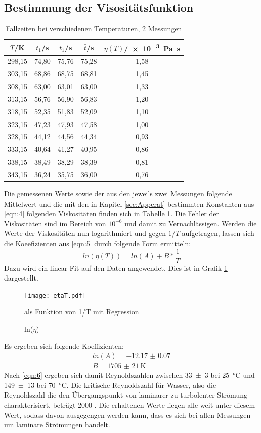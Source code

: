 \subsection{Bestimmung der Visositätsfunktion}
\begin{table}[h]
  \centering
  \caption{Fallzeiten bei verschiedenen Temperaturen, 2 Messungen}
  \label{tab:4}
  \begin{tabular}{c c c c c}
    \toprule
    $T$/\si{\kelvin} & $t_1$/\si{\second} & $t_1$/\si{\second} & $\bar{t}$/\si{\second} & $\eta(T)$/\SI{e-3}{\pascal\second} \\
    \midrule
    298,15 & 74,80 & 75,76 & 75,28 & 1,58 \\
    303,15 & 68,86 & 68,75 & 68,81 & 1,45 \\
    308,15 & 63,00 & 63,01 & 63,00 & 1,33 \\
    313,15 & 56,76 & 56,90 & 56,83 & 1,20 \\
    318,15 & 52,35 & 51,83 & 52,09 & 1,10 \\
    323,15 & 47,23 & 47,93 & 47,58 & 1,00 \\
    328,15 & 44,12 & 44,56 & 44,34 & 0,93 \\
    333,15 & 40,64 & 41,27 & 40,95 & 0,86 \\
    338,15 & 38,49 & 38,29 & 38,39 & 0,81 \\
    343,15 & 36,24 & 35,75 & 36,00 & 0,76 \\
    \bottomrule
  \end{tabular}
\end{table}
Die gemessenen Werte sowie der aus den jeweils zwei Messungen folgende Mittelwert
und die mit den in Kapitel \ref{sec:Apperat} bestimmten Konstanten aus \eqref{eqn:4} folgenden
Viskositäten finden sich in Tabelle \ref{tab:4}. Die Fehler der Viskositäten sind im Bereich von $10^{-6}$
und damit zu Vernachlässigen. Werden die Werte der Viskositäten nun logarithmiert und gegen
$1/T$ aufgetragen, lassen sich die Koeefizienten aus \eqref{eqn:5} durch folgende Form
ermitteln:
\begin{equation}
  ln(\eta(T)) = ln(A) + B * \frac{1}{T}
\end{equation}
Dazu wird ein linear Fit auf den Daten angewendet. Dies ist in Grafik \ref{plot:1} dargestellt.
\begin{figure}[h]
  \centering
     \texttt{[image: etaT.pdf]}
  \caption{ln($\eta$)} als Funktion von 1/T mit Regression
  \label{plot:1}
\end{figure}
Es ergeben sich folgende Koeffizienten:
\begin{equation*}
  \begin{split}
    ln(A) = \num{-12.17(7)} \\
    B = \SI{1705(21)}{\kelvin}
  \end{split}
\end{equation*}
Nach \eqref{eqn:6} ergeben sich damit Reynoldszahlen zwischen \num{33(3)} bei \SI{25}{\celsius}
und \num{149(13)} bei \SI{70}{\celsius}. Die kritische Reynoldszahl für Wasser, also die Reynoldszahl die den Übergangspunkt von
laminarer zu turbolenter Strömung charakterisiert, beträgt 2000 \cite[4]{Reynold}. Die erhaltenen Werte liegen alle weit unter diesem Wert,
sodass davon ausgegengen werden kann, dass es sich bei allen Messungen um laminare Strömungen handelt.
